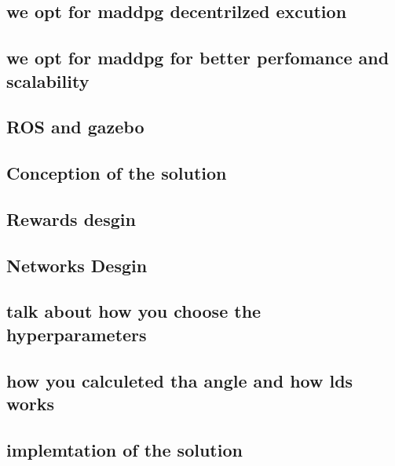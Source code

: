 \documentclass[12pt]{article}
\begin{document}
\subsection{we opt for maddpg decentrilzed excution }
\subsection{we opt for maddpg for better perfomance and scalability }


\subsection{ROS and gazebo}


\subsection{Conception of the solution}
  \subsection{Rewards desgin}
  \subsection{Networks Desgin}
  \subsection{talk about how you choose the hyperparameters}
  \subsection{how you calculeted tha angle and how lds works}
  

\subsection{implemtation of the solution}











 


\newpage


\end{document}
